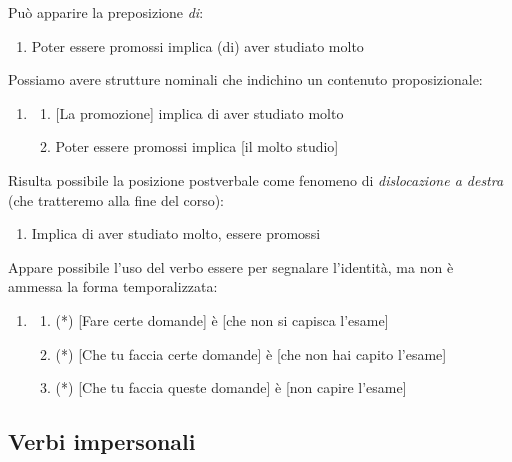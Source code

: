 \documentclass[
  a4paper,
  twoside,
  11pt,
  chapterprefix=false,
  bibliography=totocnumbered,
  listof=flat]{scrbook}
\providecommand{\tightlist}{%
  \setlength{\itemsep}{0pt}\setlength{\parskip}{0pt}}
\begin{document}
Può apparire la preposizione \emph{di}:

\begin{enumerate}
\def\labelenumi{(\arabic{enumi})}
\setcounter{enumi}{39}
\tightlist
\item
  Poter essere promossi implica (di) aver studiato molto
\end{enumerate}

Possiamo avere strutture nominali che indichino un contenuto proposizionale:

\begin{enumerate}
\def\labelenumi{(\arabic{enumi})}
\setcounter{enumi}{40}
\item
  \begin{enumerate}
  \def\labelenumii{\alph{enumii}.}
  \tightlist
  \item
    {[}La promozione{]} implica di aver studiato molto
  \item
    Poter essere promossi implica {[}il molto studio{]}
  \end{enumerate}
\end{enumerate}

Risulta possibile la posizione postverbale come fenomeno di \emph{dislocazione a destra} (che tratteremo alla fine del corso):

\begin{enumerate}
\def\labelenumi{(\arabic{enumi})}
\setcounter{enumi}{41}
\tightlist
\item
  Implica di aver studiato molto, essere promossi
\end{enumerate}

Appare possibile l'uso del verbo essere per segnalare l'identità, ma non è ammessa la forma temporalizzata:

\begin{enumerate}
\def\labelenumi{(\arabic{enumi})}
\setcounter{enumi}{42}
\item
  \begin{enumerate}
  \def\labelenumii{\alph{enumii}.}
  \tightlist
  \item
    (*) {[}Fare certe domande{]} è {[}che non si capisca l'esame{]}
  \item
    (*) {[}Che tu faccia certe domande{]} è {[}che non hai capito l'esame{]}
  \item
    (*) {[}Che tu faccia queste domande{]} è {[}non capire l'esame{]}
  \end{enumerate}
\end{enumerate}

\hypertarget{verbi-impersonali}{%
\subsection{Verbi impersonali}\label{verbi-impersonali}}
\end{document}
